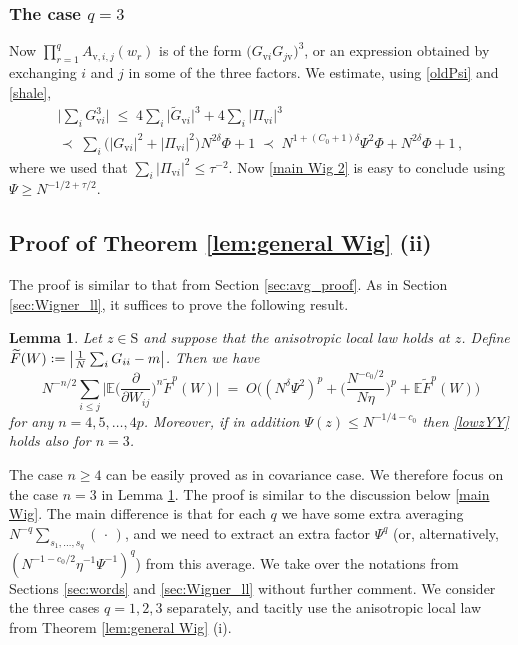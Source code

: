 \documentclass[11pt]{article} %
\numberwithin{equation}{section}
\numberwithin{figure}{section}
\theoremstyle{plain} %
\newtheorem{lemma}[theorem]{Lemma}
\theoremstyle{definition} %
\newcommand{\f}[1]{\boldsymbol{\mathrm{#1}}} %
\newcommand{\wt}{\widetilde}
\newcommand{\E}{\mathbb{E}}
\newcommand*{\deq}{\mathrel{\vcenter{\baselineskip0.65ex \lineskiplimit0pt \hbox{.}\hbox{.}}}=}
\renewcommand{\leq}{\leqslant}
\renewcommand{\geq}{\geqslant}
\newcommand{\pb}[1]{\bigl({#1}\bigr)}
\newcommand{\pbb}[1]{\biggl({#1}\biggr)}
\newcommand{\pBB}[1]{\Biggl({#1}\Biggr)}
\newcommand{\abs}[1]{\lvert #1 \rvert}
\newcommand{\absb}[1]{\bigl\lvert #1 \bigr\rvert}
\newcommand{\absbb}[1]{\biggl\lvert #1 \biggr\rvert}
\newcommand{\absBB}[1]{\Biggl\lvert #1 \Biggr\rvert}
\begin{document}
\subsubsection*{The case $q = 3$}
Now $\prod_{r = 1}^q A_{\f v,i,j }(w_r)$ is of the form $\pb{G_{\f v i} G_{j \f v}}^3$, or an expression obtained by exchanging $i$ and $j$ in some of the three factors. We estimate, using \eqref{oldPsi} and \eqref{shale},
\begin{multline*}
\absbb{\sum_i G_{\f v i}^3} \;\leq\; 4 \sum_i \abs{\wt G_{\f v i}}^3 + 4 \sum_i \abs{\Pi_{\f v i}}^3
\\
\prec\; \sum_i \pb{\abs{G_{\f v i}}^2 + \abs{\Pi_{\f v i}}^2} N^{2 \delta} \Phi + 1 \;\prec\; N^{1 + (C_0 + 1) \delta} \Psi^2 \Phi + N^{2 \delta} \Phi + 1\,,
\end{multline*}
where we used that $\sum_i \abs{\Pi_{\f v i}}^2 \leq \tau^{-2}$. Now \eqref{main Wig 2} is easy to conclude using $\Psi \geq N^{-1/2 + \tau/2}$.

 
\subsection{Proof of Theorem \ref{lem:general Wig} (ii)}
The proof is similar to that from Section \ref{sec:avg_proof}. As in Section \ref{sec:Wigner_ll}, it suffices to prove the following result.

\begin{lemma} \label{lem:Wig_main_est_avg}
Let $z \in \f S$ and suppose that the anisotropic local law holds at $z$. Define $\wt F(W) \deq \absb{\frac 1N  \sum_i G_{ii} - m}$. Then we have
\begin{equation}\label{lowzYY}
N^{-n/2}   \sum_{i\leq j} \absBB{\E \pbb{\frac{\partial}{\partial W_{ij}}}^n \wt F^p(W)}
\;=\; O \pBB{(N^{\delta}\Psi^2)^{p}+ \pbb{\frac{N^{-c_0/2}}{N\eta}}^{ p} +\E \wt F^p(W) }
\end{equation}
for any $n = 4, 5, \dots, 4p$. Moreover, if in addition $\Psi(z) \leq N^{-1/4-c_0}$ then \eqref{lowzYY} holds also for $n = 3$.
\end{lemma}

The case $n\geq 4$ can be easily proved as in covariance case. We therefore focus on the case $n = 3$ in Lemma \ref{lem:Wig_main_est_avg}. The proof is similar to the discussion below \eqref{main Wig}. The main difference is that for each $q$ we have some extra averaging
$N^{-q}\sum_{s_1, \dots, s_q} (\,\cdot\,)$, and we need to extract an extra factor $\Psi^q$ (or, alternatively, $(N^{-1-c_0/2}\eta^{-1}\Psi^{-1})^q$) from this average. We take over the notations from Sections \ref{sec:words} and \ref{sec:Wigner_ll} without further comment. We consider the three cases $q = 1,2,3$ separately, and tacitly use the anisotropic local law from Theorem \ref{lem:general Wig} (i).
\end{document}
